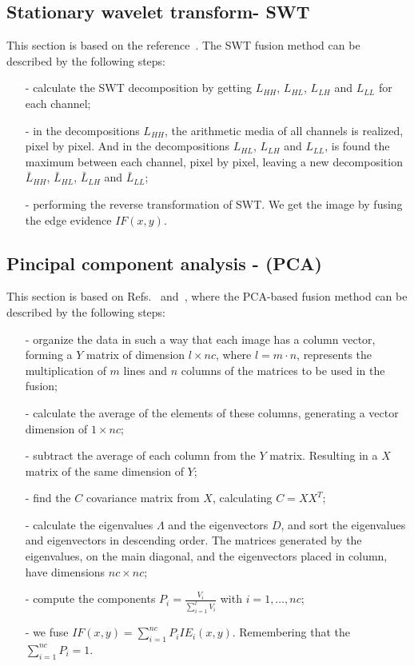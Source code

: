 \documentclass[conference]{IEEEtran}
\begin{document}
\subsection{Stationary wavelet transform- SWT} 
This section is based on the reference~\cite{n_r}. The SWT fusion method can be described by the following steps:
\begin{itemize}
\item[-] calculate the SWT decomposition by getting $L_{HH}$, $L_{HL}$, $L_{LH}$ and $L_{LL}$ for each channel;
\item[-] in the decompositions $L_{HH}$, the arithmetic media of all channels is realized, pixel by pixel. And in the decompositions $L_{HL}$, $L_{LH}$ and $L_{LL}$, is found the maximum between each channel, pixel by pixel, leaving a new decomposition $\bar{L}_{HH}$, $\bar{L}_{HL}$, $\bar{L}_{LH}$ and $\bar{L}_{LL}$;
\item[-] performing the reverse transformation of SWT. We get the image by fusing the edge evidence $IF(x,y)$.  
\end{itemize}

\subsection{Pincipal component analysis - (PCA) }
This section is based on Refs.~\cite{n_r} and~\cite{mit}, where the PCA-based fusion method can be described by the following steps:
\begin{itemize}
\item[-] organize the data in such a way that each image has a column vector, forming a $Y$ matrix of dimension $l\times nc$, where $l=m\cdot n$, represents the multiplication of $m$ lines and $n$ columns of the matrices to be used in the fusion;
\item[-] calculate the average of the elements of these columns, generating a vector dimension of $1\times nc$;
\item[-] subtract the average of each column from the $Y$ matrix. Resulting in a $X$ matrix of the same dimension of $Y$; 
\item[-] find the $C$ covariance matrix from $X$, calculating $C=XX^T$;
\item[-] calculate the eigenvalues $\Lambda$ and the eigenvectors $D$, and sort the eigenvalues and eigenvectors in descending order. The matrices generated by the eigenvalues, on the main diagonal, and the eigenvectors placed in column, have dimensions $nc\times nc$;
\item[-] compute the components $P_i=\frac{V_i}{\sum_{i=1}^l V_i}$ with $i=1,\dots,nc$;
\item[-] we fuse $IF(x,y)=\sum_{i=1}^{nc}P_iIE_i(x,y)$. Remembering that the $\sum_{i=1}^{nc}P_i=1$.
\end{itemize}
\end{document}
